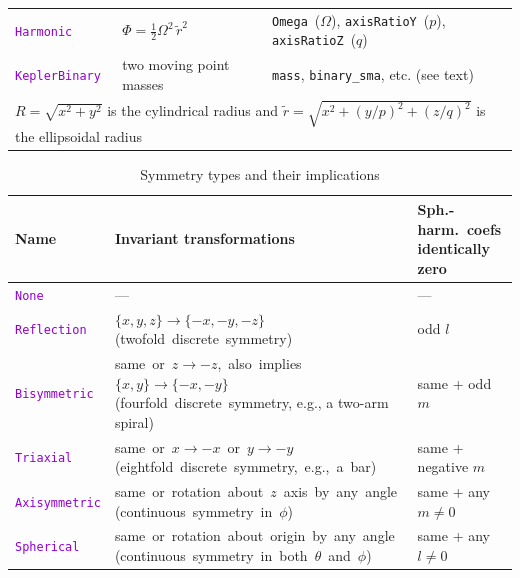 \documentclass[12pt]{article}
\newcommand{\ttt}[1]{\textcolor{darkviolet}{\texttt{#1}}}
\newcommand{\ppp}[1]{\textcolor{darkolive} {\texttt{#1}}}
\begin{document}
\begin{table}
\begin{tabular}{l m{50mm} >{\raggedright\arraybackslash}m{80mm}}
\ttt{Harmonic} & $\Phi = \frac{1}{2} \Omega^2\,\tilde r^2$ & \ppp{Omega}~($\Omega$), \ppp{axisRatioY}~($p$), \ppp{axisRatioZ}~($q$) \\[2mm]

\ttt{KeplerBinary} & two moving point masses & \ppp{mass}, \ppp{binary_sma}, etc. (see text) \\[2mm]

\multicolumn{3}{l}{\footnotesize $R=\sqrt{x^2+y^2}$ is the cylindrical radius and $\tilde r=\sqrt{x^2+(y/p)^2+(z/q)^2}$ is the ellipsoidal radius}
\end{tabular}
\end{table}

\begin{table}
\caption{Symmetry types and their implications}  \label{tab:Symmetry}
\renewcommand{\arraystretch}{1.25}
\begin{tabular}{l m{9.2cm} m{3.5cm}}
Name & Invariant transformations & \mbox{Sph.-harm.~coefs} identically zero \\
\hline
\ttt{None} & --- & --- \\[2mm]
\ttt{Reflection} & \mbox{$\{x,y,z\} \to \{-x,-y,-z\}$} \mbox{(twofold discrete symmetry)} & odd $l$ \\
\ttt{Bisymmetric} & \mbox{same or $z \to -z$, also implies $\{x,y\} \to \{-x,-y\}$} \mbox{(fourfold discrete symmetry}, e.g., a two-arm spiral) & same + odd $m$ \\
\ttt{Triaxial} & \mbox{same or $x \to -x$ or $y \to -y$} \mbox{(eightfold discrete symmetry, e.g., a bar)} & same + negative $m$ \\
\ttt{Axisymmetric} & \mbox{same or rotation about $z$ axis by any angle} \mbox{(continuous symmetry in $\phi$)} & same + any $m \ne 0$ \\
\ttt{Spherical} & \mbox{same or rotation about origin by any angle} \mbox{(continuous symmetry in both $\theta$ and $\phi$)} & same + any $l \ne 0$
\end{tabular}
\end{table}
\end{document}
